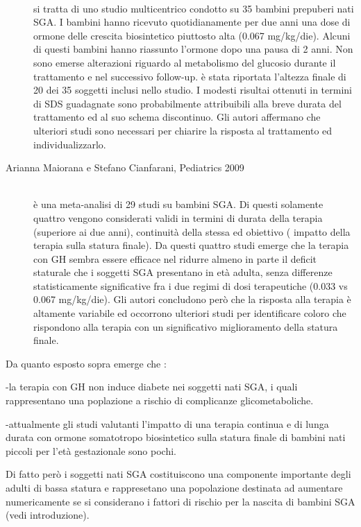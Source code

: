 \begin{description}
\item[{\parbox[t]{18cm}{Myriam Rosilio et al,\\European journal of endocrinology 2005}}] \hfill \\
 si tratta di uno studio multicentrico condotto su 35 bambini prepuberi nati SGA. I bambini hanno ricevuto quotidianamente per due anni una dose di ormone delle crescita biosintetico piuttosto alta (0.067 mg/kg/die). Alcuni di questi bambini hanno riassunto l'ormone dopo una pausa di 2 anni. Non sono emerse alterazioni riguardo al metabolismo del glucosio durante il trattamento e nel successivo follow-up. è stata riportata l'altezza finale di 20 dei 35 soggetti inclusi nello studio. I modesti risultai ottenuti in termini di SDS guadagnate sono probabilmente attribuibili alla breve durata del trattamento ed al suo schema discontinuo. Gli autori affermano che ulteriori studi sono necessari per chiarire la risposta al trattamento ed individualizzarlo.

\item[Arianna Maiorana e Stefano Cianfarani, Pediatrics 2009] \hfill \\
 è una meta-analisi di 29 studi su bambini SGA. Di questi solamente quattro vengono considerati validi in termini di durata della terapia (superiore ai due anni), continuità della stessa ed obiettivo ( impatto della terapia sulla statura finale).  Da questi quattro studi  emerge che la terapia con GH sembra essere efficace nel ridurre almeno in parte il deficit staturale che i soggetti SGA presentano in età adulta, senza differenze statisticamente significative fra i due regimi di dosi terapeutiche (0.033 vs 0.067 mg/kg/die). Gli autori concludono però che la risposta alla terapia è altamente variabile ed occorrono ulteriori studi per identificare coloro che rispondono alla terapia con un significativo miglioramento della statura finale.  

\end{description}

Da quanto esposto sopra emerge che :


-la terapia con GH non induce diabete nei soggetti nati SGA, i quali rappresentano una poplazione a rischio di complicanze glicometaboliche.


-attualmente gli studi valutanti l'impatto di una terapia continua e di lunga durata 
con ormone somatotropo biosintetico sulla statura finale di bambini nati piccoli per l'età gestazionale sono pochi.


Di fatto però i soggetti nati SGA costituiscono una componente importante degli adulti di bassa statura e rappresetano una popolazione destinata ad aumentare numericamente se si considerano i fattori di rischio per la nascita di bambini SGA (vedi introduzione).
 
